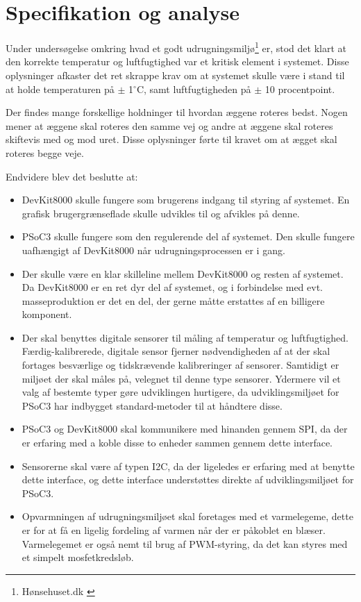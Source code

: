 \section{Specifikation og analyse}

Under undersøgelse omkring hvad et godt udrugningsmiljø\footnote{Hønsehuset.dk \cite{Rugetips}} er, stod det klart at den korrekte temperatur og luftfugtighed var et kritisk element i systemet. Disse oplysninger afkaster det ret skrappe krav om at systemet skulle være i stand til at holde temperaturen på  $\pm$ 1$^\circ$C, samt luftfugtigheden på $\pm$ 10 procentpoint.

Der findes mange forskellige holdninger til hvordan æggene roteres bedst. Nogen mener at æggene skal roteres den samme vej og andre at æggene skal roteres skiftevis med og mod uret. Disse oplysninger førte til kravet om at ægget skal roteres begge veje.   

Endvidere blev det beslutte at:

\begin{itemize}
\item DevKit8000 skulle fungere som brugerens indgang til styring af systemet. En grafisk brugergrænseflade skulle udvikles til og afvikles på denne.
\item PSoC3 skulle fungere som den regulerende del af systemet. Den skulle fungere uafhængigt af DevKit8000 når udrugningsprocessen er i gang.
\item Der skulle være en klar skilleline mellem DevKit8000 og resten af systemet. Da DevKit8000 er en ret dyr del af systemet, og i forbindelse med evt. masseproduktion er det en del, der gerne måtte erstattes af en billigere komponent.
\item Der skal benyttes digitale sensorer til måling af temperatur og luftfugtighed. Færdig-kalibrerede, digitale sensor fjerner nødvendigheden af at der skal fortages besværlige og tidskrævende kalibreringer af sensorer. Samtidigt er miljøet der skal måles på, velegnet til denne type sensorer. Ydermere vil et valg af bestemte typer gøre udviklingen hurtigere, da udviklingsmiljøet for PSoC3 har indbygget standard-metoder til at håndtere disse.
\item PSoC3 og DevKit8000 skal kommunikere med hinanden gennem SPI, da der er erfaring med a koble disse to enheder sammen gennem dette interface.
\item Sensorerne skal være af typen I2C, da der ligeledes er erfaring med at benytte dette interface, og dette interface understøttes direkte af udviklingsmiljøet for PSoC3.
\item Opvarmningen af udrugningsmiljøet skal foretages med et varmelegeme, dette er for at få en ligelig fordeling af varmen når der er påkoblet en blæser. Varmelegemet er også nemt til brug af PWM-styring, da det kan styres med et simpelt mosfetkredsløb.
\end{itemize}

